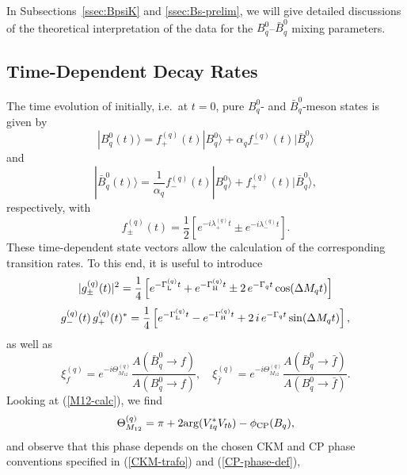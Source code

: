 \documentclass[11pt]{cernrep}
\begin{document}
In Subsections~\ref{ssec:BpsiK} and \ref{ssec:Bs-prelim}, we will give detailed
discussions of the theoretical interpretation of the data for the $B^0_q$--$\bar B^0_q$
mixing parameters.


%
%
%
\subsection{Time-Dependent Decay Rates}
%
%
%
The time evolution of initially, i.e.\ at $t=0$, pure $B^0_q$- and 
$\bar B^0_q$-meson states is given by
\begin{equation}
|B^0_q(t)\rangle=f_+^{(q)}(t)|B^{0}_q\rangle
+\alpha_qf_-^{(q)}(t)|\bar B^{0}_q\rangle
\end{equation}
and
\begin{equation}
|\bar B^0_q(t)\rangle=\frac{1}{\alpha_q}f_-^{(q)}(t)
|B^{0}_q\rangle+f_+^{(q)}(t)|\bar B^{0}_q\rangle,
\end{equation}
respectively, with
\begin{equation}\label{f-functions}
f_{\pm}^{(q)}(t)=\frac{1}{2}\left[e^{-i\lambda_+^{(q)}t}\pm
e^{-i\lambda_-^{(q)}t}\right].
\end{equation}
These time-dependent state vectors allow the calculation of the 
corresponding transition rates. To this end, it is useful to introduce
\begin{equation}\label{g-funct-1}
|g^{(q)}_{\pm}(t)|^2=\frac{1}{4}\left[e^{-\Gamma_{\rm L}^{(q)}t}+
e^{-\Gamma_{\rm H}^{(q)}t}\pm2\,e^{-\Gamma_q t}\cos(\Delta M_qt)\right]
\end{equation}
\begin{equation}\label{g-funct-2}
g_-^{(q)}(t)\,g_+^{(q)}(t)^\ast=\frac{1}{4}\left[e^{-\Gamma_{\rm L}^{(q)}t}-
e^{-\Gamma_{\rm H}^{(q)}t}+2\,i\,e^{-\Gamma_q t}\sin(\Delta M_qt)\right],
\end{equation}
as well as
\begin{equation}\label{xi-def}
\xi_f^{(q)}=e^{-i\Theta_{M_{12}}^{(q)}}
\frac{A(\bar B_q^0\to f)}{A(B_q^0\to f)},\quad
\xi_{\bar f}^{(q)}=e^{-i\Theta_{M_{12}}^{(q)}}
\frac{A(\bar B_q^0\to \bar f)}{A(B_q^0\to \bar f)}.
\end{equation}
Looking at (\ref{M12-calc}), we find
\begin{equation}\label{theta-def}
\Theta_{M_{12}}^{(q)}=\pi+2\mbox{arg}(V_{tq}^\ast V_{tb})-
\phi_{\mbox{{\scriptsize CP}}}(B_q),
\end{equation}
and observe that this phase depends on the chosen CKM and 
CP phase conventions specified in (\ref{CKM-trafo}) and (\ref{CP-phase-def}), 
\end{document}
